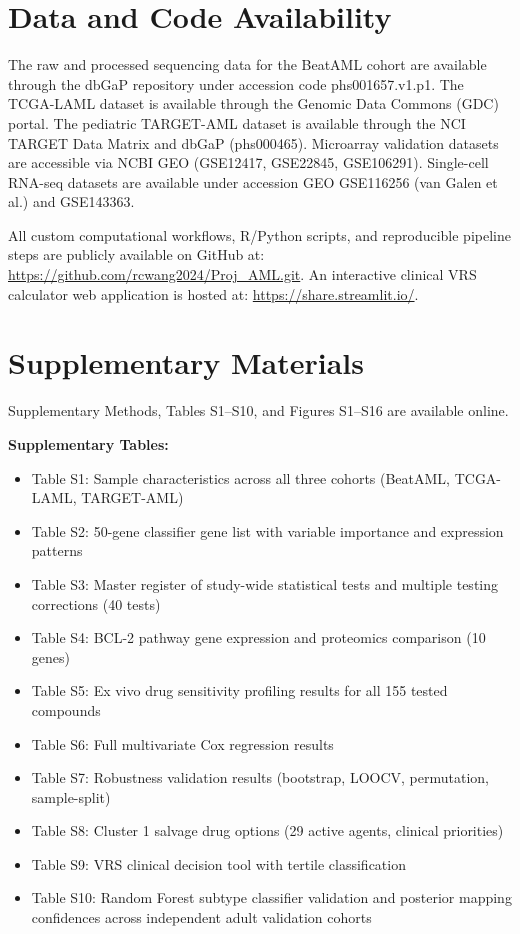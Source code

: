 \documentclass[11pt,a4paper]{article}
\begin{document}
\section*{Data and Code Availability}

The raw and processed sequencing data for the BeatAML cohort are available through the dbGaP repository under accession code phs001657.v1.p1. The TCGA-LAML dataset is available through the Genomic Data Commons (GDC) portal. The pediatric TARGET-AML dataset is available through the NCI TARGET Data Matrix and dbGaP (phs000465). Microarray validation datasets are accessible via NCBI GEO (GSE12417, GSE22845, GSE106291). Single-cell RNA-seq datasets are available under accession GEO GSE116256 (van Galen et al.) and GSE143363.

All custom computational workflows, R/Python scripts, and reproducible pipeline steps are publicly available on GitHub at: \url{https://github.com/rcwang2024/Proj_AML.git}. An interactive clinical VRS calculator web application is hosted at: \url{https://share.streamlit.io/}.

\section*{Supplementary Materials}

Supplementary Methods, Tables S1--S10, and Figures S1--S16 are available online.

\textbf{Supplementary Tables:}
\begin{itemize}
\item Table S1: Sample characteristics across all three cohorts (BeatAML, TCGA-LAML, TARGET-AML)
\item Table S2: 50-gene classifier gene list with variable importance and expression patterns
\item Table S3: Master register of study-wide statistical tests and multiple testing corrections (40 tests)
\item Table S4: BCL-2 pathway gene expression and proteomics comparison (10 genes)
\item Table S5: Ex vivo drug sensitivity profiling results for all 155 tested compounds
\item Table S6: Full multivariate Cox regression results
\item Table S7: Robustness validation results (bootstrap, LOOCV, permutation, sample-split)
\item Table S8: Cluster 1 salvage drug options (29 active agents, clinical priorities)
\item Table S9: VRS clinical decision tool with tertile classification
\item Table S10: Random Forest subtype classifier validation and posterior mapping confidences across independent adult validation cohorts
\end{itemize}
\end{document}
